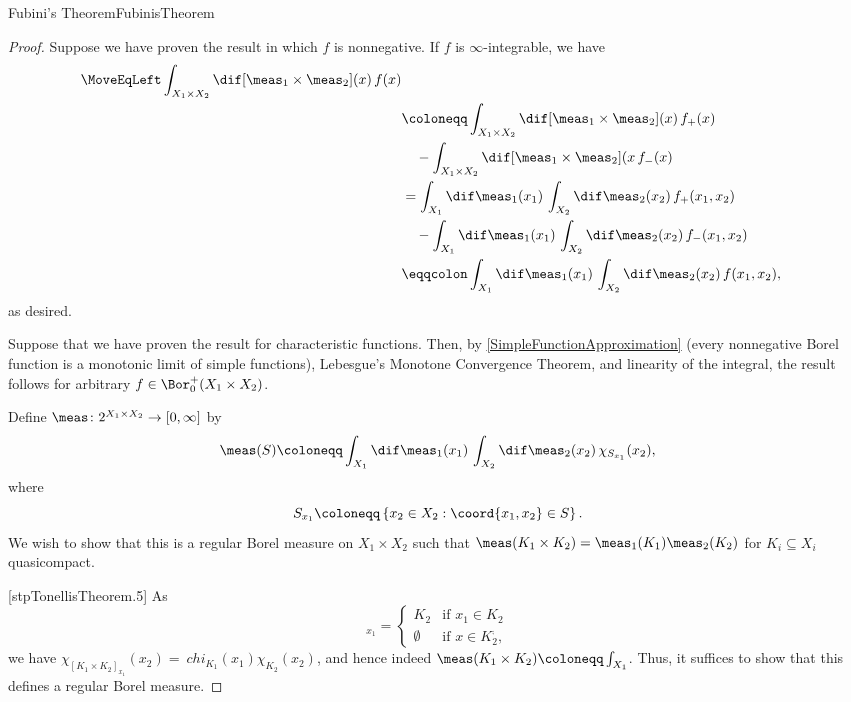 \begin{thm}{Fubini's Theorem}{FubinisTheorem}
\begin{proof}
Suppose we have proven the result in which $f$ is nonnegative.  If $f$ is $\infty$-integrable, we have
\begin{equation}
\begin{split}
\MoveEqLeft
\int _{X_1\times X_2}\dif [\meas _1\times \meas _2](x)\, f(x) \\
& \coloneqq \int _{X_1\times X_2}\dif [\meas _1\times \meas _2](x)\, f_+(x) \\ & \quad -\int _{X_1\times X_2}\dif [\meas _1\times \meas _2](x\, f_-(x) \\
& =\int _{X_1}\dif \meas _1(x_1)\, \int _{X_2}\dif \meas _2(x_2)\, f_+(x_1,x_2) \\
& \quad -\int _{X_1}\dif \meas _1(x_1)\, \int _{X_2}\dif \meas _2(x_2)\, f_-(x_1,x_2) \\
& \eqqcolon \int _{X_1}\dif \meas _1(x_1)\, \int _{X_2}\dif \meas _2(x_2)\, f(x_1,x_2),
\end{split}
\end{equation}
as desired.

Suppose that we have proven the result for characteristic functions.  Then, by \cref{SimpleFunctionApproximation} (every nonnegative Borel function is a monotonic limit of simple functions), Lebesgue's Monotone Convergence Theorem, and linearity of the integral, the result follows for arbitrary $f\in \Bor _0^+(X_1\times X_2)$.

Define $\meas \colon 2^{X_1\times X_2}\rightarrow [0,\infty ]$ by
\begin{equation}
\meas (S)\coloneqq \int _{X_1}\dif \meas _1(x_1)\, \int _{X_2}\dif \meas _2(x_2)\, \chi _{S_{x_1}}(x_2),
\end{equation}
where
\begin{equation}
S_{x_1}\coloneqq \left\{ x_2\in X_2:\coord{x_1,x_2}\in S\right\} .
\end{equation}
We wish to show that this is a regular Borel measure on $X_1\times X_2$ such that $\meas (K_1\times K_2)=\meas _1(K_1)\meas _2(K_2)$ for $K_i\subseteq X_i$ quasicompact.

[stpTonellisTheorem.5]
As
\begin{equation}
[K_1\times K_2]_{x_1}=\begin{cases}K_2 & \text{if }x_1\in K_2 \\ \emptyset & \text{if }x\in K_2^{\comp},\end{cases}
\end{equation}
we have $\chi _{[K_1\times K_2]_{x_1}}(x_2)=\ chi _{K_1}(x_1)\chi _{K_2}(x_2)$, and hence indeed $\meas (K_1\times K_2)\coloneqq \int _{X_1}$.  Thus, it suffices to show that this defines a regular Borel measure.


\end{proof}
\end{thm}
